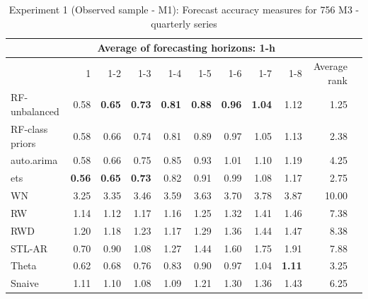 \documentclass[11pt,]{article}
\theoremstyle{definition}
\theoremstyle{definition}
\theoremstyle{definition}
\theoremstyle{remark}
\begin{document}
\begin{table}[!h]
\centering
\caption{Experiment 1 (Observed sample - M1): Forecast accuracy measures for 756 M3 - quarterly series}
\label{M3Q}
\begin{tabular}{lrrrrrrrrrl}
\hline
 & \multicolumn{8}{c|}{Average of forecasting horizons: 1-h}    &  \\ \hline
 &  1& 1-2 & 1-3 & 1-4 & 1-5 & 1-6 & 1-7 & 1-8  & Average rank  \\ \hline
RF-unbalanced& 0.58 & \bf{0.65} & \bf{0.73} & \bf{0.81} & \bf{0.88} & \bf{0.96} & \bf{1.04} & 1.12 & 1.25  \\ 
RF-class priors & 0.58&  0.66& 0.74 & 0.81 & 0.89 & 0.97 & 1.05 & 1.13   & 2.38   \\ 
auto.arima & 0.58 & 0.66  & 0.75 & 0.85 & 0.93 & 1.01 & 1.10 & 1.19 & 4.25 \\ 
ets & \bf{0.56} & \bf{0.65}  & \bf{0.73} & 0.82 & 0.91 & 0.99 & 1.08 & 1.17 & 2.75   \\ 
WN & 3.25 & 3.35 & 3.46 & 3.59 & 3.63 & 3.70 & 3.78 & 3.87 & 10.00   \\ 
RW & 1.14 & 1.12 & 1.17 & 1.16 & 1.25 & 1.32 & 1.41 & 1.46 &  7.38  \\ 
RWD & 1.20 & 1.18 & 1.23 & 1.17 & 1.29 & 1.36 & 1.44 & 1.47 & 8.38   \\ 
STL-AR & 0.70 & 0.90 & 1.08 & 1.27 & 1.44 & 1.60 & 1.75 &  1.91 & 7.88   \\ 
Theta & 0.62 & 0.68 & 0.76 & 0.83 & 0.90 & 0.97 & 1.04 &  \bf{1.11} & 3.25  \\ 
Snaive & 1.11 & 1.10 & 1.08 & 1.09 & 1.21 & 1.30 & 1.36 & 1.43 &  6.25  \\ \hline
\end{tabular}
\end{table}
\end{document}
